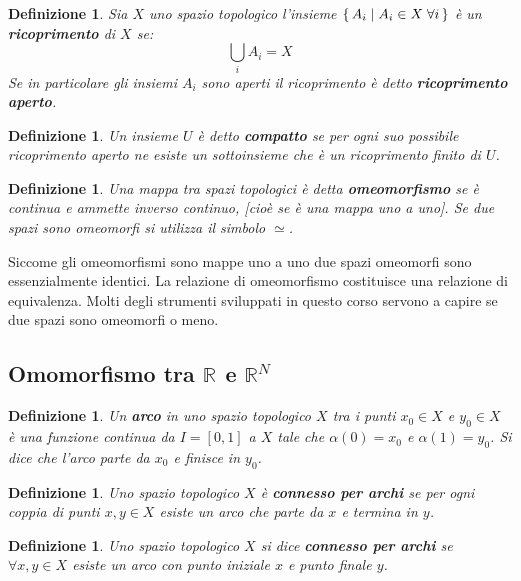 \documentclass[10pt, twoside=false, x11names]{scrbook}
\newtheorem{definition}[theorem]{Definizione}
\newcommand{\RN}[1][]{\mathbb{R}^#1}
\begin{document}
\begin{definition}
  Sia $ X $ uno spazio topologico l'insieme $ \set{A_i | A_i \in X \; \forall i} $ è un \textbf{ricoprimento}
  di $ X $ se:
  \[
    \bigcup_{i} A_i = X
  \]
  Se in particolare gli insiemi $ A_i $ sono aperti il ricoprimento è detto \textbf{ricoprimento aperto}.
\end{definition}

\begin{definition}
  Un insieme $ U $ è detto \textbf{compatto} se per ogni suo possibile ricoprimento
  aperto ne esiste un sottoinsieme che è un ricoprimento \emph{finito} di $ U $.
\end{definition}

\begin{definition}
  Una mappa tra spazi topologici è detta \textbf{omeomorfismo} se è continua
  e ammette inverso continuo, [cioè se è una mappa uno a uno]. Se due spazi sono omeomorfi si utilizza
  il simbolo $ \simeq $.
\end{definition}
Siccome gli omeomorfismi sono mappe uno a uno due spazi omeomorfi sono essenzialmente identici. La
relazione di omeomorfismo costituisce una relazione di equivalenza. Molti
degli strumenti sviluppati in questo corso servono a capire se due spazi sono omeomorfi o meno.

\subsection{Omomorfismo tra $ \RN{} $ e $ \RN{N} $}

\begin{definition}
  Un \textbf{arco} in uno spazio topologico $ X $ tra i punti $ x_0 \in X $ e $ y_0 \in X $
  è una funzione continua da $ I = [0,1] $ a $ X $ tale che $ \alpha(0) = x_0 $ e $ \alpha(1) = y_0 $.
  Si dice che l'arco parte da $ x_0 $ e finisce in $ y_0 $.
\end{definition}

\begin{definition}
  Uno spazio topologico $ X $ è \textbf{connesso per archi} se per
  ogni coppia di punti $ x, y \in X $ esiste un arco che parte da $ x $ e termina in $ y $.
\end{definition}

\begin{definition}
  Uno spazio topologico $ X $ si dice \textbf{connesso per archi}  se $ \forall x, y \in X $ esiste
  un arco con punto iniziale $ x $ e punto finale $ y $.
\end{definition}
\end{document}

